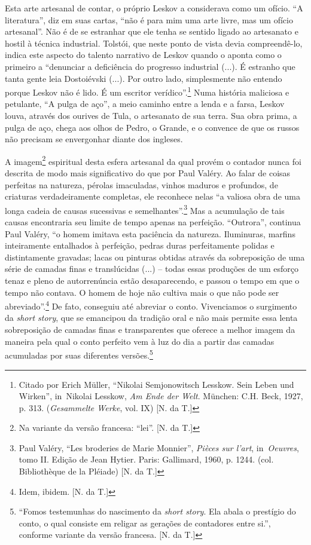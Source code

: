 Esta arte artesanal de contar, o próprio Leskov a considerava como um
ofício. ``A literatura'', diz em suas cartas, ``não é para mim uma arte
livre, mas um ofício artesanal''. Não é de se estranhar que ele tenha se
sentido ligado ao artesanato e hostil à técnica industrial. Tolstói, que
neste ponto de vista devia compreendê-lo, indica este aspecto do talento
narrativo de Leskov quando o aponta como o primeiro a ``denunciar a
deficiência do progresso industrial (...). É estranho que tanta gente
leia Dostoiévski (...). Por outro lado, simplesmente não entendo porque
Leskov não é lido. É um escritor verídico''.\footnote{Citado por Erich
  Müller, ``Nikolai Semjonowitsch Lesskow. Sein Leben und Wirken'',
  in~Nikolai Lesskow, \emph{Am Ende der Welt}. München: C.H. Beck, 1927,
  p. 313. (\emph{Gesammelte Werke}, vol. IX) {[}N. da T.{]}} Numa
história maliciosa e petulante, ``A pulga de aço'', a meio caminho entre
a lenda e a farsa, Leskov louva, através dos ourives de Tula, o
artesanato de sua terra. Sua obra prima, a pulga de aço, chega aos olhos
de Pedro, o Grande, e o convence de que os russos não precisam se
envergonhar diante dos ingleses.

A imagem\footnote{Na variante da versão francesa: ``lei''. {[}N. da
  T.{]}} espiritual desta esfera artesanal da qual provém o contador
nunca foi descrita de modo mais significativo do que por Paul Valéry. Ao
falar de coisas perfeitas na natureza, pérolas imaculadas, vinhos
maduros e profundos, de criaturas verdadeiramente completas, ele
reconhece nelas ``a valiosa obra de uma longa cadeia de causas
sucessivas e semelhantes''.\footnote{Paul Valéry, ``Les broderies de
  Marie Monnier'', \emph{Pièces sur l'art}, in~\emph{Oeuvres}, tomo II.
  Edição de Jean Hytier. Paris: Gallimard, 1960, p. 1244. (col.
  Bibliothèque de la Pléiade) {[}N. da T.{]}} Mas a acumulação de tais
causas encontraria seu limite de tempo apenas na perfeição. ``Outrora'',
continua Paul Valéry, ``o homem imitava esta paciência da natureza.
Iluminuras, marfins inteiramente entalhados à perfeição, pedras duras
perfeitamente polidas e distintamente gravadas; lacas ou pinturas
obtidas através da sobreposição de uma série de camadas finas e
translúcidas (...) -- todas essas produções de um esforço tenaz e pleno
de autorrenúncia estão desaparecendo, e passou o tempo em que o tempo
não contava. O homem de hoje não cultiva mais o que não pode ser
abreviado''.\footnote{Idem, ibidem. {[}N. da T.{]}} De fato, conseguiu
até abreviar o conto. Vivenciamos o surgimento da \emph{short story},
que se emancipou da tradição oral e não mais permite essa lenta
sobreposição de camadas finas e transparentes que oferece a melhor
imagem da maneira pela qual o conto perfeito vem à luz do dia a partir
das camadas acumuladas por suas diferentes versões.\footnote{``Fomos
  testemunhas do nascimento da \emph{short story}. Ela abala o prestígio
  do conto, o qual consiste em religar as gerações de contadores entre
  si.'', conforme variante da versão francesa. {[}N. da T.{]}}

